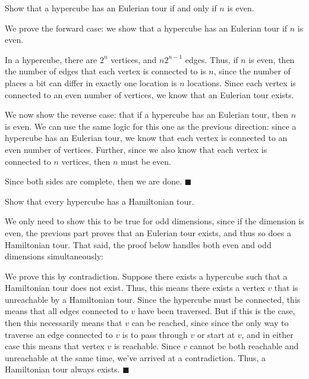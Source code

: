 \documentclass[11pt]{article}
\begin{document}
\begin{Parts}

    \Part Show that a hypercube has an Eulerian tour if and only if $n$ is even.
    
    \begin{solution}
        We prove the forward case: we show that a hypercube has an Eulerian tour if $n$ is even.

        In a hypercube, there are $2^n$ vertices, and $n2^{n-1}$ edges. Thus, if $n$ is even, then the number of edges that each vertex is connected to is $n$, since the number of places a bit can differ in exactly one location is $n$ locations. Since each vertex is connected to an even number of vertices, we know that an Eulerian tour exists. 

        We now show the reverse case: that if a hypercube has an Eulerian tour, then $n$ is even. We can use the same logic for this one as the previous direction: since a hypercube has an Eulerian tour, we know that each vertex is connected to an even number of vertices. Further, since we also know that each vertex is connected to $n$ vertices, then $n$ must be even. 

        Since both sides are complete, then we are done. $\blacksquare$
    \end{solution}
    \Part Show that every hypercube has a Hamiltonian tour. 

    \begin{solution}
        We only need to show this to be true for odd dimensions, since if the dimension is even, the previous part proves that an Eulerian tour exists, and thus so does a Hamiltonian tour. That said, the proof below handles both even and odd dimensions simultaneously:

        We prove this by contradiction. Suppose there exists a hypercube such that a Hamiltonian tour does not exist. Thus, this means there exists a vertex $v$ that is unreachable by a Hamiltonian tour. Since the hypercube must be connected, this means that all edges connected to $v$ have been traversed. But if this is the case, then this necessarily means that $v$ can be reached, since since the only way to traverse an edge connected to $v$ is to pass through $v$ or start at $v$, and in either case this means that vertex $v$ is reachable. Since $v$ cannot be both reachable and unreachable at the same time, we've arrived at a contradiction. Thus, a Hamiltonian tour always exists. $\blacksquare$
    \end{solution}

\end{Parts}
\pagebreak
{}
\end{document}
